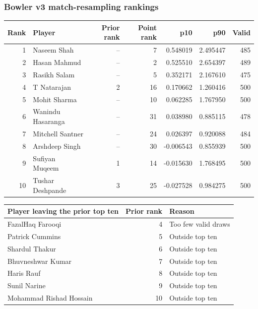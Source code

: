 \clearpage

\subsubsection*{Bowler v3 match-resampling rankings}

\begin{center}
\begin{tabularx}{\linewidth}{r>{\raggedright\arraybackslash}Xrrrrr}
\toprule
Rank & Player & Prior rank & Point rank & p10 & p90 & Valid \\
\midrule
1 & Naseem Shah & -- & 7 & 0.548019 & 2.495447 & 485 \\
2 & Hasan Mahmud & -- & 2 & 0.525510 & 2.654397 & 489 \\
3 & Rasikh Salam & -- & 5 & 0.352171 & 2.167610 & 475 \\
4 & T Natarajan & 2 & 16 & 0.170662 & 1.260416 & 500 \\
5 & Mohit Sharma & -- & 10 & 0.062285 & 1.767950 & 500 \\
6 & Wanindu Hasaranga & -- & 31 & 0.038980 & 0.885115 & 478 \\
7 & Mitchell Santner & -- & 24 & 0.026397 & 0.920088 & 484 \\
8 & Arshdeep Singh & -- & 30 & -0.006543 & 0.855939 & 500 \\
9 & Sufiyan Muqeem & 1 & 14 & -0.015630 & 1.768495 & 500 \\
10 & Tushar Deshpande & 3 & 25 & -0.027528 & 0.984275 & 500 \\
\bottomrule
\end{tabularx}
\end{center}

\begin{center}
\begin{tabularx}{\linewidth}{>{\raggedright\arraybackslash}Xr>{\raggedright\arraybackslash}X}
\toprule
Player leaving the prior top ten & Prior rank & Reason \\
\midrule
FazalHaq Farooqi & 4 & Too few valid draws \\
Patrick Cummins & 5 & Outside top ten \\
Shardul Thakur & 6 & Outside top ten \\
Bhuvneshwar Kumar & 7 & Outside top ten \\
Haris Rauf & 8 & Outside top ten \\
Sunil Narine & 9 & Outside top ten \\
Mohammad Rishad Hossain & 10 & Outside top ten \\
\bottomrule
\end{tabularx}
\end{center}

